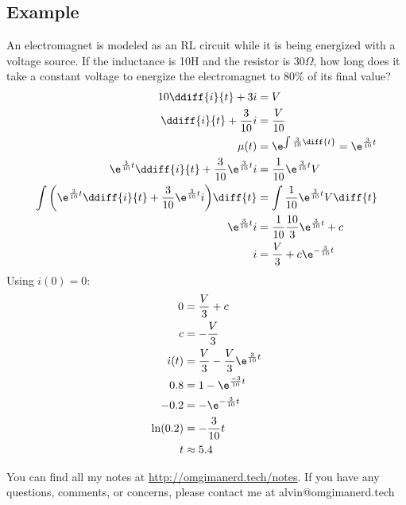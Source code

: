 \documentclass{math}
\begin{document}
\subsection*{Example}
An electromagnet is modeled as an RL circuit while it is being energized with
a voltage source. If the inductance is 10H and the resistor is \( 30\Omega \),
how long does it take a constant voltage to energize the electromagnet to
80\% of its final value?
\begin{align*}
  10\ddiff{i}{t}+3i &= V \\
  \ddiff{i}{t}+\frac{3}{10}i &= \frac{V}{10} \\
  \mu(t) &= \e^{\int\frac{3}{10}\diff{t}} = \e^{\frac{3}{10}t} \\
  \e^{\frac{3}{10}t}\ddiff{i}{t}+\frac{3}{10}\e^{\frac{3}{10}t}i &=
    \frac{1}{10}\e^{\frac{3}{10}t}V \\
  \int\bigg(\e^{\frac{3}{10}t}\ddiff{i}{t}+\frac{3}{10}\e^{\frac{3}{10}t}i\bigg)
    \diff{t} &= \int\frac{1}{10}\e^{\frac{3}{10}t}V\diff{t} \\
  \e^{\frac{3}{10}t}i &= \frac{1}{10}\frac{10}{3}\e^{\frac{3}{10}t}+c \\
  i &= \frac{V}{3}+c\e^{-\frac{3}{10}t} \\
\end{align*}
Using \( i(0) = 0 \):
\begin{align*}
  0 &= \frac{V}{3}+c \\
  c &= -\frac{V}{3} \\
  i(t) &= \frac{V}{3}-\frac{V}{3}\e^{\frac{3}{10}t} \\
  0.8 &= 1-\e^{\frac{-3}{10}t} \\
  -0.2 &= -\e^{-\frac{3}{10}t} \\
  \ln(0.2) &= -\frac{3}{10}t \\
  t &\approx 5.4
\end{align*}

\begin{center}
  You can find all my notes at \url{http://omgimanerd.tech/notes}. If you have
  any questions, comments, or concerns, please contact me at
  alvin@omgimanerd.tech
\end{center}
\end{document}
